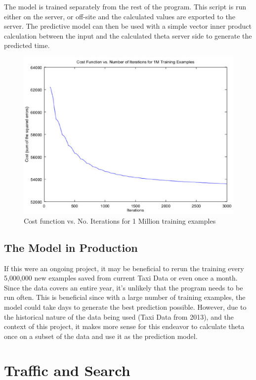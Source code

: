 \documentclass{sig-alternate}
\begin{document}
The model is trained separately from the rest of the program. This script is run either on the server, or off-site and the calculated values are exported to the server. The predictive model can then be used with a simple vector inner product calculation between the input and the calculated theta server side to generate the predicted time.

\begin{figure}
\centering
\includegraphics[scale=0.35]{Cost_Function_Graph_1M.eps}
\caption{Cost function vs. No. Iterations for 1 Million training examples}
\end{figure}

\subsection{The Model in Production}
	
If this were an ongoing project, it may be beneficial to rerun the training every 5,000,000 new examples saved from current Taxi Data or even once a month. Since the data covers an entire year, it's unlikely that the program needs to be run often. This is beneficial since with a large number of training examples, the model could take days to generate the best prediction possible. However, due to the historical nature of the data being used (Taxi Data from 2013), and the context of this project, it makes more sense for this endeavor to calculate theta once on a subset of the data and use it as the prediction model.

\section{Traffic and Search}
\end{document}

